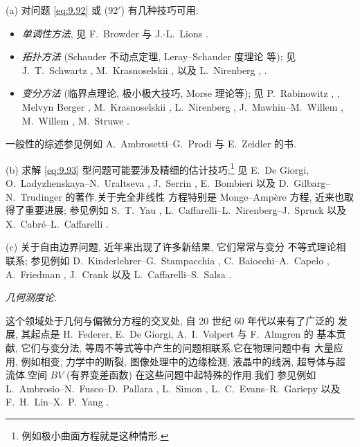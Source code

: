 
\noindent (a) 对问题 \eqref{eq:9.92} 或 (92$'$) 有几种技巧可用:

\begin{itemize}
	\item \emph{单调性方法}, 见 F.~Browder  与
	      J.-L.~Lions .
	\item \emph{拓扑方法} (Schauder 不动点定理, Leray--Schauder 度理论
	      等); 见 J.~T.~Schwartz ,
	      M.~Krasnoselskii , 以及
	      L.~Nirenberg , .
	\item \emph{变分方法} (临界点理论, 极小极大技巧, Morse 理论等); 见
	      P.~Rabinowitz , ,
	      Melvyn Berger ,
	      M.~Krasnoselskii ,
	      L.~Nirenberg ,
	      J.~Mawhin--M.~Willem ,
	      M.~Willem , M.~Struwe .
\end{itemize}

一般性的综述参见例如 A.~Ambrosetti--G.~Prodi 
与 E.~Zeidler  的书.

\noindent (b) 求解 \eqref{eq:9.93} 型问题可能要涉及精细的估计技巧;\footnote{
例如极小曲面方程就是这种情形.} 见 E.~De Giorgi,
O.~Ladyzhenskaya--N.~Uraltseva ,
J.~Serrin , E.~Bombieri  以及
D.~Gilbarg--N.~Trudinger  的著作.关于完全非线性
方程特别是 Monge--Amp\`ere 方程, 近来也取得了重要进展; 参见例如
S.~T.~Yau , L.~Caffarelli--L.~Nirenberg--J.~Spruck
 以及 X.~Cabr\'e--L.~Caffarelli
.

\noindent (c) 关于自由边界问题, 近年来出现了许多新结果, 它们常常与变分
不等式理论相联系; 参见例如 D.~Kinderlehrer--G.~Stampacchia
, C.~Baiocchi--A.~Capelo
, A.~Friedman ,
J.~Crank  以及 L.~Caffarelli--S.~Salsa
.

 \emph{几何测度论.}

这个领域处于几何与偏微分方程的交叉处, 自 20 世纪 60 年代以来有了广泛的
发展, 其起点是 H.~Federer, E.~De Giorgi, A.~I.~Volpert 与 F.~Almgren 的
基本贡献, 它们与变分法, 等周不等式等中产生的问题相联系.它在物理问题中有
大量应用, 例如相变, 力学中的断裂, 图像处理中的边缘检测, 液晶中的线涡, 超导体与超流体.空间 $BV$ (有界变差函数) 在这些问题中起特殊的作用.我们
参见例如 L.~Ambrosio--N.~Fusco--D.~Pallara ,
L.~Simon , L.~C.~Evans--R.~Gariepy 
以及 F.~H.~Lin--X.~P.~Yang .
